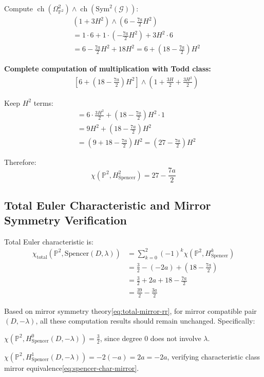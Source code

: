 \documentclass[a4paper,12pt]{extarticle}
\newcommand{\ch}{\operatorname{ch}}
\theoremstyle{definition}
\begin{document}
Compute $\ch(\Omega^2_{\mathbb{P}^2}) \wedge \ch(\mathrm{Sym}^2(\mathcal{G}))$:
\begin{align}
&(1 + 3H^2) \wedge \left(6 - \frac{7a}{2}H^2\right) \\
&= 1 \cdot 6 + 1 \cdot \left(-\frac{7a}{2}H^2\right) + 3H^2 \cdot 6 \\
&= 6 - \frac{7a}{2}H^2 + 18H^2 = 6 + \left(18 - \frac{7a}{2}\right)H^2
\end{align}

\textbf{Complete computation of multiplication with Todd class:}
\begin{align}
&\left[6 + \left(18 - \frac{7a}{2}\right)H^2\right] \wedge \left(1 + \frac{3H}{2} + \frac{3H^2}{2}\right)
\end{align}

Keep $H^2$ terms:
\begin{align}
&= 6 \cdot \frac{3H^2}{2} + \left(18 - \frac{7a}{2}\right)H^2 \cdot 1 \\
&= 9H^2 + \left(18 - \frac{7a}{2}\right)H^2 \\
&= \left(9 + 18 - \frac{7a}{2}\right)H^2 = \left(27 - \frac{7a}{2}\right)H^2
\end{align}

Therefore:
$$\chi(\mathbb{P}^2, H^2_{\mathrm{Spencer}}) = 27 - \frac{7a}{2}$$

\subsection{Total Euler Characteristic and Mirror Symmetry Verification}

Total Euler characteristic is:
\begin{align}
\chi_{\mathrm{total}}(\mathbb{P}^2, \mathrm{Spencer}(D,\lambda)) &= \sum_{k=0}^2 (-1)^k \chi(\mathbb{P}^2, H^k_{\mathrm{Spencer}}) \\
&= \frac{3}{2} - (-2a) + \left(18 - \frac{7a}{2}\right) \\
&= \frac{3}{2} + 2a + 18 - \frac{7a}{2} \\
&= \frac{39}{2} - \frac{3a}{2}
\end{align}

Based on mirror symmetry theory\eqref{eq:total-mirror-rr}, for mirror compatible pair $(D,-\lambda)$, all these computation results should remain unchanged. Specifically:

$\chi(\mathbb{P}^2, H^0_{\mathrm{Spencer}}(D,-\lambda)) = \frac{3}{2}$, since degree 0 does not involve $\lambda$.

$\chi(\mathbb{P}^2, H^1_{\mathrm{Spencer}}(D,-\lambda)) = -2(-a) = 2a = -2a$, verifying characteristic class mirror equivalence\eqref{eq:spencer-char-mirror}.
\end{document}
